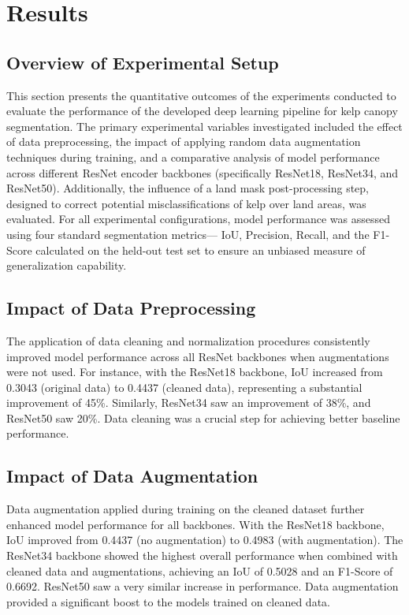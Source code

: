 \documentclass{article}
\begin{document}
\section{Results}

\subsection{Overview of Experimental Setup} %

This section presents the quantitative outcomes of the experiments conducted to evaluate the performance of the developed deep learning pipeline for kelp canopy segmentation. The primary experimental variables investigated included the effect of data preprocessing, the impact of applying random data augmentation techniques during training, and a comparative analysis of model performance across different ResNet encoder backbones (specifically ResNet18, ResNet34, and ResNet50). Additionally, the influence of a land mask post-processing step, designed to correct potential misclassifications of kelp over land areas, was evaluated. For all experimental configurations, model performance was assessed using four standard segmentation metrics— IoU, Precision, Recall, and the F1-Score calculated on the held-out test set to ensure an unbiased measure of generalization capability.

\subsection{Impact of Data Preprocessing}

The application of data cleaning and normalization procedures consistently improved model performance across all ResNet backbones when augmentations were not used. For instance, with the ResNet18 backbone, IoU increased from 0.3043 (original data) to 0.4437 (cleaned data), representing a substantial improvement of 45\%. Similarly, ResNet34 saw an improvement of 38\%, and ResNet50 saw 20\%. Data cleaning was a crucial step for achieving better baseline performance.

\subsection{Impact of Data Augmentation} %

Data augmentation applied during training on the cleaned dataset further enhanced model performance for all backbones. With the ResNet18 backbone, IoU improved from 0.4437 (no augmentation) to 0.4983 (with augmentation). The ResNet34 backbone showed the highest overall performance when combined with cleaned data and augmentations, achieving an IoU of 0.5028 and an F1-Score of 0.6692. ResNet50 saw a very similar increase in performance. Data augmentation provided a significant boost to the models trained on cleaned data.
\end{document}
